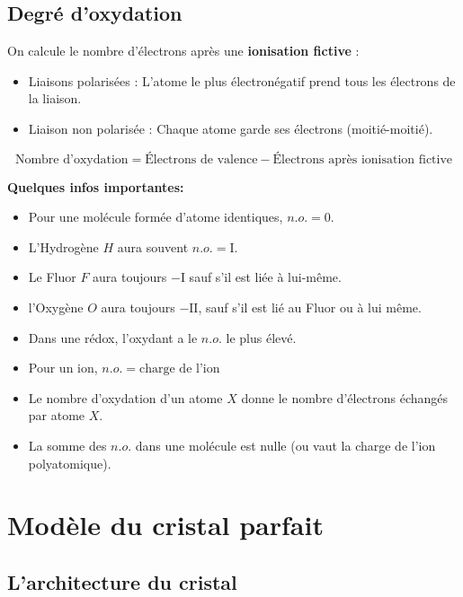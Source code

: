 \documentclass{article}
\begin{document}
\subsection{Degré d'oxydation}\label{subsec:degre-d'oxydation}

On calcule le nombre d'électrons après une \textbf{ionisation fictive} :
\begin{itemize}[label=$\ast$]
    \item Liaisons polarisées : L'atome le plus électronégatif prend tous les électrons de la liaison.
    \item Liaison non polarisée : Chaque atome garde ses électrons (moitié-moitié).
\end{itemize}

$$\text{Nombre d'oxydation} = \text{Électrons de valence} - \text{Électrons après ionisation fictive}$$

\vspace{5mm}
\noindent\textbf{Quelques infos importantes:}
\begin{itemize}[label=$\ast$]
    \item Pour une molécule formée d'atome identiques, $n.o. = 0$.
    \item L'Hydrogène $H$ aura souvent $n.o. = \mathrm{I}$.
    \item Le Fluor $F$ aura toujours $-\mathrm{I}$ sauf s'il est liée à lui-même.
    \item l'Oxygène $O$ aura toujours $-\mathrm{II}$, sauf s'il est lié au Fluor ou à lui même.
    \item Dans une rédox, l'oxydant a le $n.o.$ le plus élevé.
    \item Pour un ion, $n.o. = \text{charge de l'ion}$
    \item Le nombre d'oxydation d'un atome $X$ donne le nombre d'électrons échangés par atome $X$.
    \item La somme des $n.o.$ dans une molécule est nulle (ou vaut la charge de l'ion polyatomique).
\end{itemize}


\section{Modèle du cristal parfait}\label{ch:modele-du-cristal-parfait}


\subsection{L'architecture du cristal}\label{sec:l'architecture-du-cristal}
\end{document}
